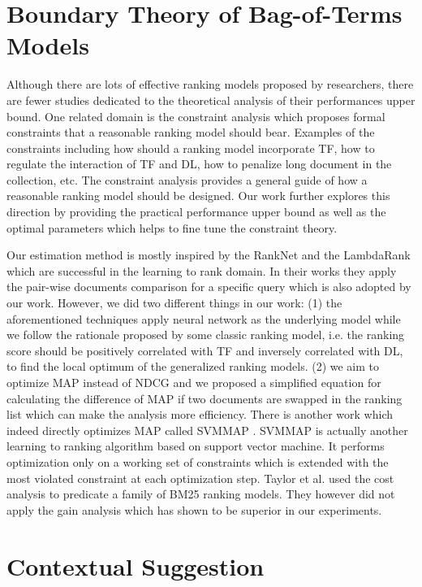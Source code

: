 \section{Boundary Theory of Bag-of-Terms Models}

Although there are lots of effective ranking models proposed by researchers, 
there are fewer studies dedicated to the theoretical analysis of their 
performances upper bound. One related domain is the constraint analysis \cite{Fang:2004:FSI:1008992.1009004} which proposes formal constraints 
that a reasonable ranking model should bear. Examples of the constraints 
including how should a ranking model incorporate TF, how to regulate 
the interaction of TF and DL, how to penalize long document in the 
collection, etc. The constraint analysis provides a general guide of how 
a reasonable ranking model should be designed. Our work further explores 
this direction by providing the practical performance upper bound as 
well as the optimal parameters which helps to fine tune the constraint 
theory. 

Our estimation method is mostly inspired by the RankNet 
\cite{export:68133,export:132652} and the LambdaRank \cite{export:132652,export:81144} which are 
successful in the learning to rank domain. 
In their works they apply the pair-wise documents comparison for a 
specific query which is also adopted by our work.
However, we did two different things in our work: 
(1) the aforementioned techniques apply neural network as the underlying 
model while we follow the rationale proposed by some classic ranking 
model, i.e. the ranking score should be positively correlated with TF and 
inversely correlated with DL, to find the local optimum of the generalized 
ranking models.
(2) we aim to optimize MAP instead of NDCG and we proposed a simplified 
equation for calculating the difference of MAP if two documents are 
swapped in the ranking list which can make the analysis more efficiency. 
There is another work which indeed directly optimizes MAP called SVMMAP \cite{Yue:2007:SVM:1277741.1277790}. SVMMAP is actually another learning 
to ranking algorithm based on support vector machine. It performs 
optimization only on a working set of constraints which is extended with 
the most violated constraint at each optimization step. 
Taylor et al. \cite{Taylor:2006:OMR:1183614.1183698} used the cost 
analysis to predicate a family of BM25 ranking models. They however 
did not apply the gain analysis which has shown to be superior in 
our experiments.


\section{Contextual Suggestion}

